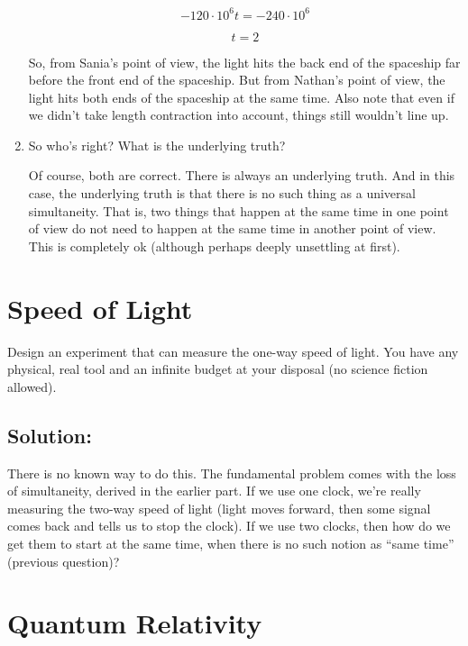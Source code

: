 \documentclass{article}
\begin{document}
\begin{enumerate}[label=(\alph*)]
    $$-120 \cdot 10^6 t = -240 \cdot 10^6$$

    $$\boxed{t = 2}$$

    So, from Sania's point of view, the light hits the back end of the spaceship far before the front end of the spaceship. But from Nathan's point of view, the light hits both ends of the spaceship at the same time. Also note that even if we didn't take length contraction into account, things still wouldn't line up.

    \item So who's right? What is the underlying truth?

    Of course, both are correct. There is always an underlying truth. And in this case, the underlying truth is that there is no such thing as a universal simultaneity. That is, two things that happen at the same time in one point of view do not need to happen at the same time in another point of view. This is completely ok (although perhaps deeply unsettling at first).
\end{enumerate}

\vfill

\section{Speed of Light}

Design an experiment that can measure the one-way speed of light. You have any physical, real tool and an infinite budget at your disposal (no science fiction allowed).

\subsection{Solution:}

There is no known way to do this. The fundamental problem comes with the loss of simultaneity, derived in the earlier part. If we use one clock, we're really measuring the two-way speed of light (light moves forward, then some signal comes back and tells us to stop the clock). If we use two clocks, then how do we get them to start at the same time, when there is no such notion as ``same time'' (previous question)?

\newpage

\section{Quantum Relativity}
\end{document}
